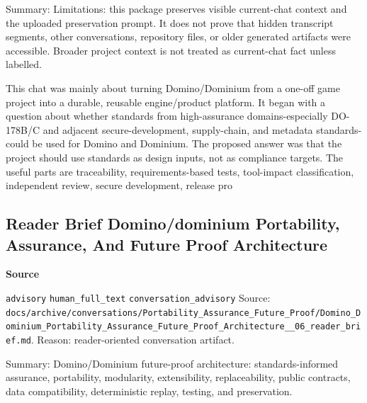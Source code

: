 \documentclass[9pt,a4paper,openany]{book}
\newcommand{\vonecallout}[3]{\par\medskip\noindent\begingroup\setlength{\fboxsep}{7pt}\colorbox{DomCalloutBg}{\parbox{0.94\linewidth}{\textbf{\textcolor{#1}{#2}}\par #3}}\endgroup\par\medskip}
\begin{document}
Summary: Limitations: this package preserves visible current-\allowbreak{}chat context and the uploaded preservation prompt.\allowbreak{} It does not prove that hidden transcript segments, other conversations, repository files, or older generated artifacts were accessible.\allowbreak{} Broader project context is not treated as current-\allowbreak{}chat fact unless labelled.\allowbreak{}


This chat was mainly about turning Domino/\allowbreak{}Dominium from a one-\allowbreak{}off game project into a durable, reusable engine/\allowbreak{}product platform.\allowbreak{} It began with a question about whether standards from high-\allowbreak{}assurance domains-\allowbreak{}especially DO-\allowbreak{}178B/\allowbreak{}C and adjacent secure-\allowbreak{}development, supply-\allowbreak{}chain, and metadata standards-\allowbreak{}could be used for Domino and Dominium.\allowbreak{} The proposed answer was that the project should use standards as design inputs, not as compliance targets.\allowbreak{} The useful parts are traceability, requirements-\allowbreak{}based tests, tool-\allowbreak{}impact classification, independent review, secure development, release pro



\subsection{Reader Brief Domino/dominium Portability, Assurance, And Future Proof Architecture}

\vonecallout{DomSlate}{Source}{\texttt{advisory} \texttt{human\_\allowbreak{}full\_\allowbreak{}text} \texttt{conversation\_\allowbreak{}advisory} Source: \texttt{docs/\allowbreak{}archive/\allowbreak{}conversations/\allowbreak{}Portability\_\allowbreak{}Assurance\_\allowbreak{}Future\_\allowbreak{}Proof/\allowbreak{}Domino\_\allowbreak{}Dominium\_\allowbreak{}Portability\_\allowbreak{}Assurance\_\allowbreak{}Future\_\allowbreak{}Proof\_\allowbreak{}Architecture\_\allowbreak{}\_\allowbreak{}06\_\allowbreak{}reader\_\allowbreak{}brief.\allowbreak{}md}.\allowbreak{} Reason: reader-\allowbreak{}oriented conversation artifact.\allowbreak{}}

Summary: Domino/\allowbreak{}Dominium future-\allowbreak{}proof architecture: standards-\allowbreak{}informed assurance, portability, modularity, extensibility, replaceability, public contracts, data compatibility, deterministic replay, testing, and preservation.\allowbreak{}
\end{document}

